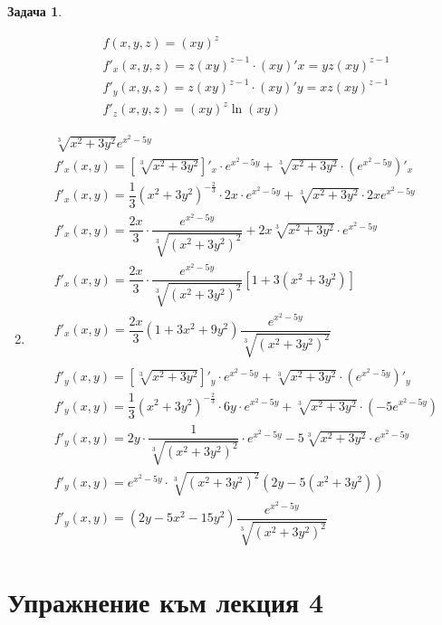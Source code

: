 \documentclass[a4paper,fleqn,12pt]{article}
\theoremstyle{definition}
\newtheorem{task}{Задача}[subsection]
\begin{document}
\begin{task}
\begin{enumerate}
\begin{gather*}
f(x,y,z) = (xy)^z\\
f'_x(x,y,z) = z(xy)^{z-1} \cdot (xy)'x = yz(xy)^{z-1}\\
f'_y(x,y,z) = z(xy)^{z-1} \cdot (xy)'y = xz(xy)^{z-1}\\
f'_z(x,y,z) = (xy)^z \ln{(xy)}
\end{gather*}
\item 
\begin{gather*}
\sqrt[3]{x^2+3y^2} e^{x^2 - 5y}\\
f'_x(x,y) = \left[ \sqrt[3]{x^2+3y^2} \right]'_x \cdot e^{x^2 - 5y} + \sqrt[3]{x^2+3y^2} \cdot (e^{x^2 - 5y})'_x\\
f'_x(x,y) = \dfrac{1}{3} (x^2 + 3y^2)^{- \frac{2}{3}} \cdot 2x  \cdot e^{x^2 - 5y} +  \sqrt[3]{x^2+3y^2}\cdot 2x e^{x^2 - 5y} \\
f'_x(x,y) = \dfrac{2x}{3} \cdot \dfrac{e^{x^2 - 5y}}{\sqrt[3]{(x^2+3y^2)^2}} + 2x \sqrt[3]{x^2+3y^2} \cdot e^{x^2 - 5y} \\
f'_x(x,y) = \dfrac{2x}{3} \cdot \dfrac{e^{x^2 - 5y}}{\sqrt[3]{(x^2+3y^2)^2}} \left[ 1 + 3(x^2 + 3y^2) \right] \\
f'_x(x,y) = \dfrac{2x}{3} (1 + 3x^2 + 9y^2) \dfrac {e^{x^2 - 5y}}{\sqrt[3]{(x^2+3y^2)^2}}\\
\\
f'_y(x,y) =  \left[ \sqrt[3]{x^2+3y^2} \right]'_y \cdot e^{x^2 - 5y} + \sqrt[3]{x^2+3y^2} \cdot (e^{x^2 - 5y})'_y\\
f'_y(x,y) = \dfrac{1}{3} (x^2 + 3y^2)^{- \frac{2}{3}} \cdot 6y  \cdot e^{x^2 - 5y} +  \sqrt[3]{x^2+3y^2}\cdot (-5e^{x^2 - 5y}) \\
f'_y(x,y) = 2y \cdot \dfrac{1}{\sqrt[3]{(x^2+3y^2)^2}} \cdot e^{x^2 - 5y} - 5  \sqrt[3]{x^2+3y^2}\cdot e^{x^2 - 5y} \\
f'_y(x,y) = e^{x^2 - 5y} \cdot \sqrt[3]{(x^2+3y^2)^2} (2y - 5(x^2 + 3y^2)) \\
f'_y(x,y) = (2y - 5x^2 - 15y^2) \dfrac{e^{x^2 - 5y}}{\sqrt[3]{(x^2+3y^2)^2}}
\end{gather*}
\end{enumerate}
\end{task}

\newpage
\section{Упражнение към лекция 4}
\end{document}
